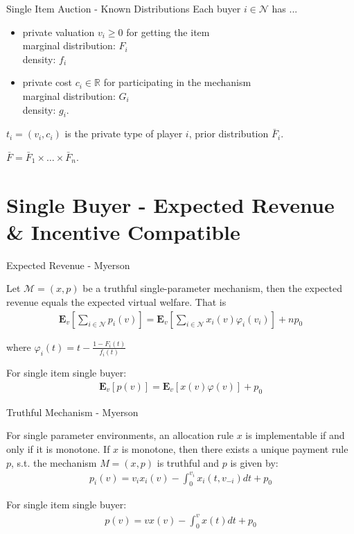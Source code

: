 \documentclass{beamer}
\begin{document}
\begin{frame}{Single Item Auction - Known Distributions}
  Each buyer $i \in \mathcal{N}$ has ...
  \begin{itemize}
    \item private valuation $v_i \geq 0$ for getting the item\\
          marginal distribution: $F_i$\\
          density: $f_i$
    \item private cost $c_i \in \mathbb{R}$ for participating in the mechanism \\
          marginal distribution: $G_i$ \\
          density: $g_i$.
  \end{itemize}
  $t_i = (v_i, c_i)$ is the private type of player $i$, prior distribution $\bar{F}_i$.

  $\bar{F} = \bar{F}_1 \times \dots \times \bar{F}_n$.
\end{frame}

\section{Single Buyer - Expected Revenue \& Incentive Compatible}

\begin{frame}{Expected Revenue - Myerson}
  \begin{lemma}
    Let $\mathcal{M}=(x,p)$ be a truthful single-parameter mechanism, then the expected revenue equals the expected virtual welfare. That is
    \begin{align*}
      \mathbf{E}_v\left[\sum_{i \in \mathcal{N}}p_i(v)\right]
      = \mathbf{E}_v\left[\sum_{i \in \mathcal{N}}x_i(v)\varphi_i(v_i)\right] + n p_0
    \end{align*}

    where $\varphi_i(t) = t - \frac{1 - F_i(t)}{f_i(t)}$
  \end{lemma}

  For single item single buyer:
  \begin{align*}
    \mathbf{E}_v\left[p(v)\right]
    = \mathbf{E}_v\left[x(v)\varphi(v)\right] + p_0
  \end{align*}
\end{frame}

\begin{frame}{Truthful Mechanism - Myerson}
  \begin{lemma}
    For single parameter environments, an allocation rule $x$ is implementable if and only if it is monotone.
    If $x$ is monotone, then there exists a unique payment rule $p$, s.t. the mechanism $M=(x,p)$ is truthful
    and $p$ is given by:
    \begin{align*}
      p_i(v) = v_i x_i(v) - \int_0^{v_i} x_i(t,v_{-i})dt + p_0
    \end{align*}
  \end{lemma}

  For single item single buyer:
  \begin{align*}
    p(v) = v x(v) - \int_0^v x(t) dt + p_0
  \end{align*}
\end{frame}
\end{document}
